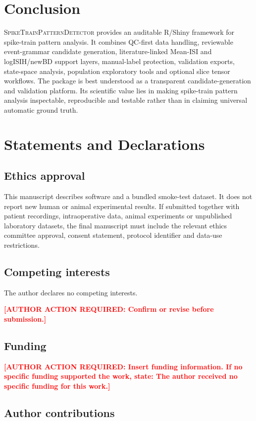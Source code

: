 \documentclass[pdflatex,sn-apa]{sn-jnl}
\newcommand{\stpd}{\textsc{SpikeTrainPatternDetector}}
\newcommand{\TODONOTE}[1]{\par\medskip\noindent\textbf{\textcolor{red}{[AUTHOR ACTION REQUIRED: #1]}}\par\medskip}
\begin{document}
\section{Conclusion}

\stpd{} provides an auditable R/Shiny framework for spike-train pattern analysis. It combines QC-first data handling, reviewable event-grammar candidate generation, literature-linked Mean-ISI and logISIH/newBD support layers, manual-label protection, validation exports, state-space analysis, population exploratory tools and optional slice tensor workflows. The package is best understood as a transparent candidate-generation and validation platform. Its scientific value lies in making spike-train pattern analysis inspectable, reproducible and testable rather than in claiming universal automatic ground truth.

\section*{Statements and Declarations}

\subsection*{Ethics approval}

This manuscript describes software and a bundled smoke-test dataset. It does not report new human or animal experimental results. If submitted together with patient recordings, intraoperative data, animal experiments or unpublished laboratory datasets, the final manuscript must include the relevant ethics committee approval, consent statement, protocol identifier and data-use restrictions.

\subsection*{Competing interests}

The author declares no competing interests. \TODONOTE{Confirm or revise before submission.}

\subsection*{Funding}

\TODONOTE{Insert funding information. If no specific funding supported the work, state: The author received no specific funding for this work.}

\subsection*{Author contributions}
\end{document}
